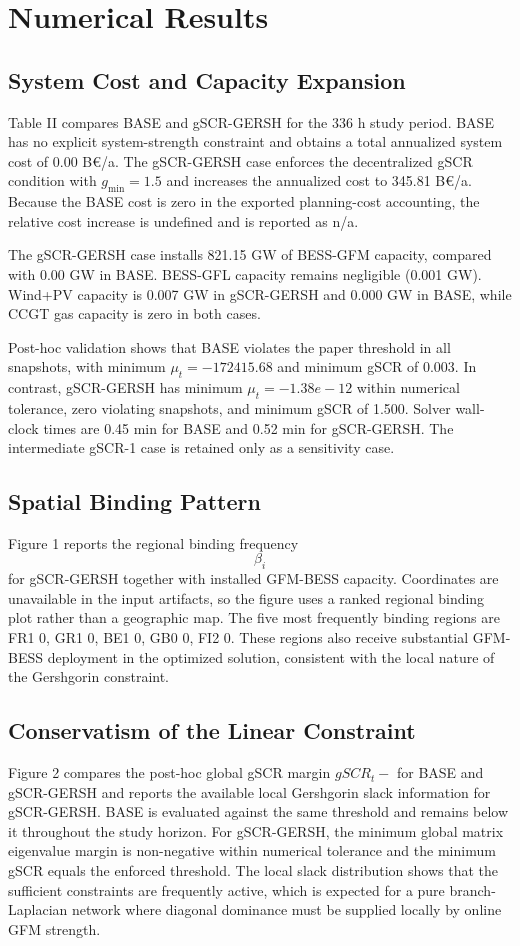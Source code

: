 \section{Numerical Results}
\label{sec:results}

\subsection{System Cost and Capacity Expansion}

Table II compares BASE and gSCR-GERSH for the 336 h study period. BASE has no explicit system-strength constraint and obtains a total annualized system cost of 0.00 B€/a. The gSCR-GERSH case enforces the decentralized gSCR condition with $g_{\min}=1.5$ and increases the annualized cost to 345.81 B€/a. Because the BASE cost is zero in the exported planning-cost accounting, the relative cost increase is undefined and is reported as n/a.

The gSCR-GERSH case installs 821.15 GW of BESS-GFM capacity, compared with 0.00 GW in BASE. BESS-GFL capacity remains negligible (0.001 GW). Wind+PV capacity is 0.007 GW in gSCR-GERSH and 0.000 GW in BASE, while CCGT gas capacity is zero in both cases.

Post-hoc validation shows that BASE violates the paper threshold in all snapshots, with minimum $\mu_t = -172415.68$ and minimum gSCR of 0.003. In contrast, gSCR-GERSH has minimum $\mu_t = -1.38e-12$ within numerical tolerance, zero violating snapshots, and minimum gSCR of 1.500. Solver wall-clock times are 0.45 min for BASE and 0.52 min for gSCR-GERSH. The intermediate gSCR-1 case is retained only as a sensitivity case.

\subsection{Spatial Binding Pattern}

Figure 1 reports the regional binding frequency $$\beta_i$$ for gSCR-GERSH together with installed GFM-BESS capacity. Coordinates are unavailable in the input artifacts, so the figure uses a ranked regional binding plot rather than a geographic map. The five most frequently binding regions are FR1 0, GR1 0, BE1 0, GB0 0, FI2 0. These regions also receive substantial GFM-BESS deployment in the optimized solution, consistent with the local nature of the Gershgorin constraint.

\subsection{Conservatism of the Linear Constraint}

Figure 2 compares the post-hoc global gSCR margin $gSCR_t-$\alpha$$ for BASE and gSCR-GERSH and reports the available local Gershgorin slack information for gSCR-GERSH. BASE is evaluated against the same threshold and remains below it throughout the study horizon. For gSCR-GERSH, the minimum global matrix eigenvalue margin is non-negative within numerical tolerance and the minimum gSCR equals the enforced threshold. The local slack distribution shows that the sufficient constraints are frequently active, which is expected for a pure branch-Laplacian network where diagonal dominance must be supplied locally by online GFM strength.
